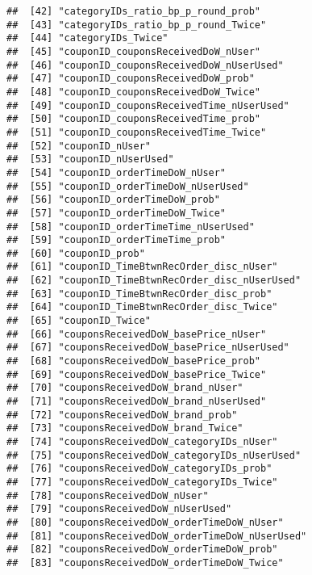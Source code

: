 \documentclass[10pt]{report}
\begin{document}
\begin{verbatim}
##  [42] "categoryIDs_ratio_bp_p_round_prob"                  
##  [43] "categoryIDs_ratio_bp_p_round_Twice"                 
##  [44] "categoryIDs_Twice"                                  
##  [45] "couponID_couponsReceivedDoW_nUser"                  
##  [46] "couponID_couponsReceivedDoW_nUserUsed"              
##  [47] "couponID_couponsReceivedDoW_prob"                   
##  [48] "couponID_couponsReceivedDoW_Twice"                  
##  [49] "couponID_couponsReceivedTime_nUserUsed"             
##  [50] "couponID_couponsReceivedTime_prob"                  
##  [51] "couponID_couponsReceivedTime_Twice"                 
##  [52] "couponID_nUser"                                     
##  [53] "couponID_nUserUsed"                                 
##  [54] "couponID_orderTimeDoW_nUser"                        
##  [55] "couponID_orderTimeDoW_nUserUsed"                    
##  [56] "couponID_orderTimeDoW_prob"                         
##  [57] "couponID_orderTimeDoW_Twice"                        
##  [58] "couponID_orderTimeTime_nUserUsed"                   
##  [59] "couponID_orderTimeTime_prob"                        
##  [60] "couponID_prob"                                      
##  [61] "couponID_TimeBtwnRecOrder_disc_nUser"               
##  [62] "couponID_TimeBtwnRecOrder_disc_nUserUsed"           
##  [63] "couponID_TimeBtwnRecOrder_disc_prob"                
##  [64] "couponID_TimeBtwnRecOrder_disc_Twice"               
##  [65] "couponID_Twice"                                     
##  [66] "couponsReceivedDoW_basePrice_nUser"                 
##  [67] "couponsReceivedDoW_basePrice_nUserUsed"             
##  [68] "couponsReceivedDoW_basePrice_prob"                  
##  [69] "couponsReceivedDoW_basePrice_Twice"                 
##  [70] "couponsReceivedDoW_brand_nUser"                     
##  [71] "couponsReceivedDoW_brand_nUserUsed"                 
##  [72] "couponsReceivedDoW_brand_prob"                      
##  [73] "couponsReceivedDoW_brand_Twice"                     
##  [74] "couponsReceivedDoW_categoryIDs_nUser"               
##  [75] "couponsReceivedDoW_categoryIDs_nUserUsed"           
##  [76] "couponsReceivedDoW_categoryIDs_prob"                
##  [77] "couponsReceivedDoW_categoryIDs_Twice"               
##  [78] "couponsReceivedDoW_nUser"                           
##  [79] "couponsReceivedDoW_nUserUsed"                       
##  [80] "couponsReceivedDoW_orderTimeDoW_nUser"              
##  [81] "couponsReceivedDoW_orderTimeDoW_nUserUsed"          
##  [82] "couponsReceivedDoW_orderTimeDoW_prob"               
##  [83] "couponsReceivedDoW_orderTimeDoW_Twice"              

\end{verbatim}
\end{document}
